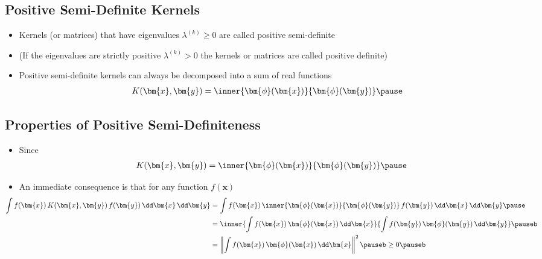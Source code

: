 \Outline %

\begin{slide}
\section{Positive Semi-Definite Kernels}

\begin{PauseHighLight}
  \begin{itemize}
  \item Kernels (or matrices) that have eigenvalues $\lambda^{(k)}\geq0$ are
    called positive semi-definite\pause
  \item (If the eigenvalues are strictly positive $\lambda^{(k)}>0$ the
    kernels or matrices are called positive definite)\pause
  \item Positive semi-definite kernels can always be decomposed into a
    sum of real functions
    \begin{align*}
      K(\bm{x}, \bm{y}) &= \inner{\bm{\phi}(\bm{x})}{\bm{\phi}(\bm{y})}\pause
    \end{align*}
  \end{itemize}
\end{PauseHighLight}


\end{slide}


\begin{slide}
\section[-1]{Properties of Positive Semi-Definiteness}

\begin{PauseHighLight}
  \begin{itemize}
  \item Since 
    \begin{align*}
      K(\bm{x}, \bm{y}) =  \inner{\strut\bm{\phi}(\bm{x})}{\bm{\phi}(\bm{y})}\pause
    \end{align*}
  \item An immediate consequence is that for any function $f(\bm{x})$
   \begin{align*}
      \hspace*{-2em}\int f(\bm{x})\, K(\bm{x}, \bm{y})\, f(\bm{y})\,\dd\bm{x}\, \dd
       \bm{y} &= \int f(\bm{x}) \,
                \inner{\strut\bm{\phi}(\bm{x})}{\bm{\phi}(\bm{y})}
                \, f(\bm{y})\,\dd\bm{x}\, \dd \bm{y}\pause  \\
      &=\inner{\int f(\bm{x})\,
        \bm{\phi}(\bm{x})\,\dd\bm{x}}{\int f(\bm{y})\,
        \bm{\phi}(\bm{y})\,\dd\bm{y}}\pauseb \\
     &= \left\| \int f(\bm{x})\,
        \bm{\phi}(\bm{x})\,\dd\bm{x}\right\|^2 \pauseb \geq 0\pauseb
    \end{align*}
  \end{itemize}
\end{PauseHighLight}


\end{slide}

